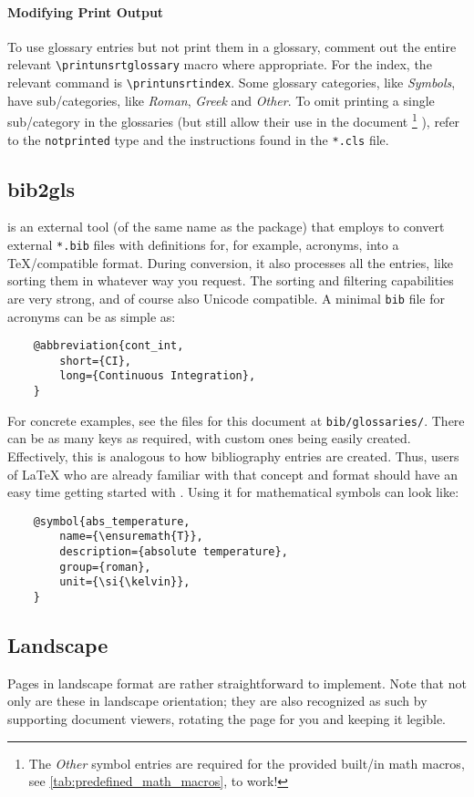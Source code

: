 \paragraph{Modifying Print Output}
To use glossary entries but not print them in a glossary, comment out the entire
relevant \verb|\printunsrtglossary| macro where appropriate.
For the index, the relevant command is \verb|\printunsrtindex|.
Some glossary categories, like \emph{Symbols}, have sub\-/categories, like \emph{Roman},
\emph{Greek} and \emph{Other}.
To omit printing a single sub\-/category in the glossaries (but still allow their use
in the document%
\footnote{
    The \emph{Other} symbol entries are required for the provided built\-/in math
    macros, see \cref{tab:predefined_math_macros}, to work!%
}%
), refer to the \texttt{notprinted} type and the instructions found in the \texttt{*.cls}
file.

\subsection{bib2gls}
\label{ch:bib2gls}

 is an external tool (of the same name as the package) that
 employs to convert external \texttt{*.bib} files with
definitions for, for example, acronyms, into a \TeX{}\-/compatible format.
During conversion, it also processes all the entries, like sorting them in whatever
way you request.
The sorting and filtering capabilities are very strong, and of course also Unicode
compatible.
A minimal \texttt{bib} file for acronyms can be as simple as:
\begin{verbatim}
    @abbreviation{cont_int,
        short={CI},
        long={Continuous Integration},
    }
\end{verbatim}
For concrete examples, see the files for this document at \texttt{bib/glossaries/}.
There can be as many keys as required, with custom ones being easily created.
Effectively, this is analogous to how bibliography entries are created.
Thus, users of \LaTeX{} who are already familiar with that concept and format
should have an easy time getting started with .
Using it for mathematical symbols can look like:
\begin{verbatim}
    @symbol{abs_temperature,
        name={\ensuremath{T}},
        description={absolute temperature},
        group={roman},
        unit={\si{\kelvin}},
    }
\end{verbatim}

\begin{landscape}
    \section{Landscape}

    Pages in landscape format are rather straightforward to implement.
    Note that not only are these in landscape orientation; they are also recognized
    as such by supporting document viewers, rotating the page for you and keeping
    it legible.
\end{landscape}
